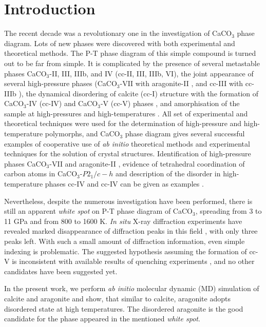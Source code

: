 \documentclass[journal=jacsat,manuscript=article]{achemso}
\begin{document}
\section{Introduction}
The recent decade was a revolutionary one in the investigation of CaCO$_3$ phase diagram. 
Lots of new phases were discovered with both experimental and theoretical methods. 
The P-T phase diagram of this simple compound is turned out to be far from simple. It is complicated by the presence of several metastable phases CaCO$_3$-II, III, IIIb, and IV (cc-II, III, IIIb, VI), the joint appearance of several high-pressure phases (CaCO$_3$-VII with aragonite-II \cite{gavr2017_aragII}, and cc-III with cc-IIIb \cite{merlini2014}), the dynamical disordering of calcite (cc-I) structure with the formation of CaCO$_3$-IV (cc-IV) and CaCO$_3$-V (cc-V) phases \cite{ishizawa2013, dove2005}, and amorphisation of the sample at high-pressures and high-temperatures \cite{hou2019_amorph}. 
All set of experimental and theoretical techniques were used for the determination of high-pressure and high-temperature polymorphs, and CaCO$_3$ phase diagram gives several successful examples of cooperative use of {\it ab initio} theoretical methods and experimental techniques for the solution of crystal structures. 
Identification of high-pressure phases CaCO$_3$-VII and aragonite-II \cite{gavr2017_aragII, smith2018}, evidence of tetrahedral coordination of carbon atoms in CaCO$_3$-$P2_1/c-h$ \cite{lobanov2017} and description of the disorder in high-temperature phases cc-IV and cc-IV can be given as examples \cite{dove2005}.

Nevertheless, despite the numerous investigation have been performed, there is still an apparent {\it white spot} on P-T phase diagram of CaCO$_3$, spreading from 3 to 11 GPa and from 800 to 1600 K. 
{\it In situ} X-ray diffraction experiments have revealed marked disappearance of diffraction peaks in this field \cite{suito2001, litasov2017}, with only three peaks left. 
With such a small amount of diffraction information, even simple indexing is problematic. 
The suggested hypothesis assuming the formation of cc-V \cite{suito2001} is inconsistent with available results of quenching experiments \cite{shatskiy2014_feco3}, and no other candidates have been suggested yet. 


In the present work, we perform {\it ab initio} molecular dynamic (MD) simulation of calcite and aragonite and show, that similar to calcite, aragonite adopts disordered state at high temperatures. The disordered aragonite is the good candidate for the phase appeared in the mentioned {\it white spot}.
\end{document}

